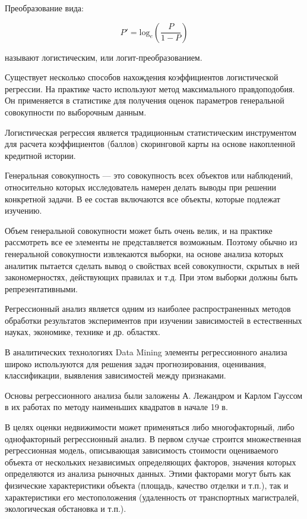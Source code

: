 Преобразование вида:

\begin{equation}
	{P'} =  \text{log}_{e}(\frac{P}{1-P})
\end{equation}

называют логистическим, или логит-преобразованием.

Существует несколько способов нахождения коэффициентов логистической регрессии. На практике часто используют метод
максимального правдоподобия. Он применяется в статистике для получения оценок параметров генеральной совокупности по
выборочным данным.

Логистическая регрессия является традиционным статистическим инструментом для расчета коэффициентов (баллов) скоринговой
карты на основе накопленной кредитной истории.

Генеральная совокупность — это совокупность всех объектов или наблюдений, относительно которых исследователь намерен
делать выводы при решении конкретной задачи. В ее состав включаются все объекты, которые подлежат изучению.

Объем генеральной совокупности может быть очень велик, и на практике рассмотреть все ее элементы не представляется
возможным. Поэтому обычно из генеральной совокупности извлекаются выборки, на основе анализа которых аналитик пытается
сделать вывод о свойствах всей совокупности, скрытых в ней закономерностях, действующих правилах и т.д. При этом выборки
должны быть репрезентативными.

Регрессионный анализ является одним из наиболее распространенных методов обработки результатов экспериментов при
изучении зависимостей в естественных науках, экономике, технике и др. областях.

В аналитических технологиях Data Mining элементы регрессионного анализа широко используются для решения задач
прогнозирования, оценивания, классификации, выявления зависимостей между признаками.

Основы регрессионного анализа были заложены А. Лежандром и Карлом Гауссом в их работах по методу наименьших квадратов в
начале 19 в.~\cite{regression_analysis}

В целях оценки недвижимости может применяться либо многофакторный, либо однофакторный регрессионный анализ.
В первом случае строится множественная регрессионная модель, описывающая зависимость стоимости оцениваемого объекта от
нескольких независимых определяющих факторов, значения которых определяются из анализа рыночных данных.
Этими факторами могут быть как физические характеристики объекта (площадь, качество отделки и т.п.), так и
характеристики его местоположения (удаленность от транспортных магистралей, экологическая обстановка и т.п.).

